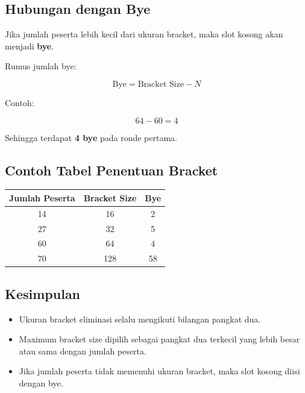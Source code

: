 \subsection{Hubungan dengan Bye}

Jika jumlah peserta lebih kecil dari ukuran bracket, maka slot kosong akan menjadi \textbf{bye}.

Rumus jumlah bye:

\[
\text{Bye} = \text{Bracket Size} - N
\]

Contoh:

\[
64 - 60 = 4
\]

Sehingga terdapat \textbf{4 bye} pada ronde pertama.

\subsection{Contoh Tabel Penentuan Bracket}

\begin{center}
\begin{tabular}{|c|c|c|}
\hline
Jumlah Peserta & Bracket Size & Bye \\
\hline
14 & 16 & 2 \\
27 & 32 & 5 \\
60 & 64 & 4 \\
70 & 128 & 58 \\
\hline
\end{tabular}
\end{center}

\subsection{Kesimpulan}

\begin{itemize}
\item Ukuran bracket eliminasi selalu mengikuti bilangan pangkat dua.
\item Maximum bracket size dipilih sebagai pangkat dua terkecil yang lebih besar atau sama dengan jumlah peserta.
\item Jika jumlah peserta tidak memenuhi ukuran bracket, maka slot kosong diisi dengan bye.
\end{itemize}